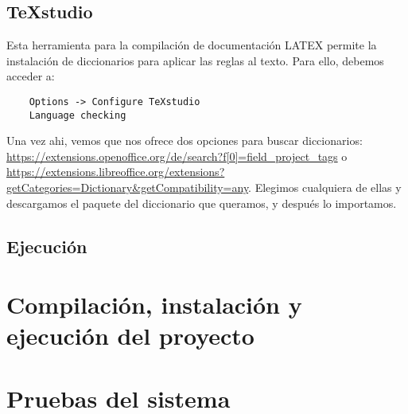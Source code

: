 \subsection{TeXstudio}
Esta herramienta para la compilación de documentación LATEX permite la instalación de diccionarios para aplicar las reglas al texto. Para ello, debemos acceder a:
\begin{lstlisting}
	Options -> Configure TeXstudio
	Language checking
\end{lstlisting}
Una vez ahi, vemos que nos ofrece dos opciones para buscar diccionarios: \url{https://extensions.openoffice.org/de/search?f[0]=field_project_tags} o \url{https://extensions.libreoffice.org/extensions?getCategories=Dictionary&getCompatibility=any}. Elegimos cualquiera de ellas y descargamos el paquete del diccionario que queramos, y después lo importamos.


\subsection{Ejecución}

\section{Compilación, instalación y ejecución del proyecto}


\section{Pruebas del sistema}
